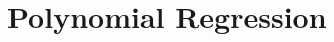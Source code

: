 \documentclass[aspectratio=169,usenames,dvipsnames]{beamer}
\newcommand{\InstructorNotes}[1]{\textit{\color{orange}#1}}
\begin{document}
  



\section{Polynomial Regression}
\end{document}
